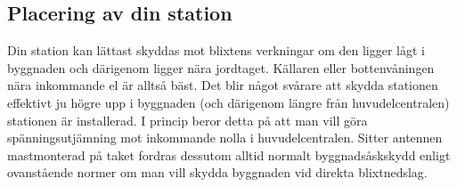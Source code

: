 
\subsection{Placering av din station}
Din station kan lättast skyddas mot blixtens verkningar om den ligger lågt i
byggnaden och därigenom ligger nära jordtaget.
Källaren eller bottenvåningen nära inkommande el är alltså bäst.
Det blir något svårare att skydda stationen effektivt ju högre upp i byggnaden
(och därigenom längre från huvudelcentralen) stationen är installerad.
I princip beror detta på att man vill göra spänningsutjämning mot inkommande
nolla i huvudelcentralen.
Sitter antennen mastmonterad på taket fordras dessutom alltid normalt
byggnadsåskskydd enligt ovanstående normer om man vill skydda byggnaden vid
direkta blixtnedslag.

